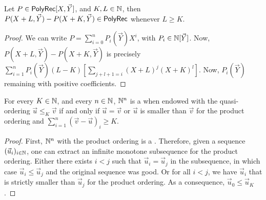\begin{fact}
    Let $P \in \mathsf{PolyRec}[X,\vec{Y}]$, and $K,L \in \mathbb{N}$,
    then $P(X+L, \vec{Y}) - P(X+K,\vec{Y}) \in \mathsf{PolyRec}$
    whenever $L \geq K$.
\end{fact}
\begin{proof}
    We can write
    $P = \sum_{i = 0}^n P_i(\vec{Y}) X^i$, with $P_i \in \mathbb{N}[\vec{Y}]$.
    Now,
    $P(X+L,\vec{Y}) - P(X+K,\vec{Y})$
    is precisely
    $\sum_{i = 1}^n P_i(\vec{Y}) (L-K) \left[ \sum_{j + l + 1= i} (X+L)^j (X+K)^l \right]$.
    Now, $P_i(\vec{Y})$
    remaining with positive coefficients.
\end{proof}
\begin{fact}
    For every $K \in \mathbb{N}$, and every $n \in \mathbb{N}$,
    $\mathbb{N}^n$ is a 
    when endowed with the quasi-ordering $\vec{u} \leq_K \vec{v}$
    if and only if $\vec{u} = \vec{v}$ or
    $\vec{u}$ is smaller than $\vec{v}$ for the product ordering and
    $\sum_{i = 1}^n  (\vec{v} - \vec{u})_i \geq K$.
\end{fact}
\begin{proof}
    First, $\mathbb{N}^n$ with the product ordering is a .
    Therefore, given a sequence $(\vec{u}_i)_{i \in \mathbb{N}}$,
    one can extract an infinite monotone subsequence for
    the product ordering.
    Either there exists $i < j$ such that $\vec{u}_i = \vec{u}_j$
    in the subsequence, in which case $\vec{u}_i \leq \vec{u}_j$
    and the original sequence was good. Or for all $i < j$,
    we have $\vec{u}_i$ that is strictly smaller than 
    $\vec{u}_j$ for the product ordering. As a consequence,
    $\vec{u}_0 \leq \vec{u}_K$.
\end{proof}



